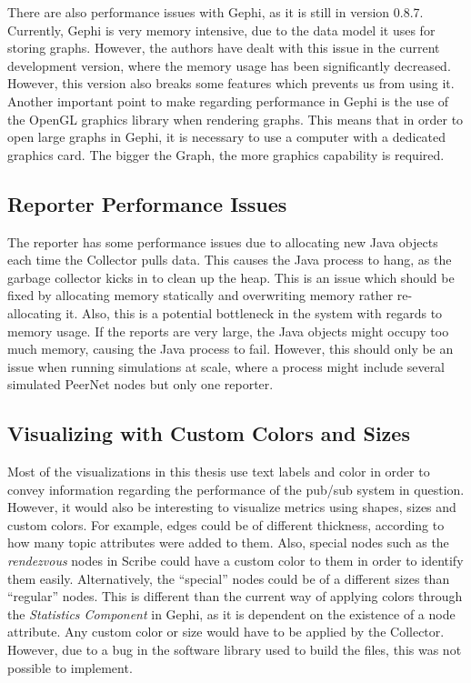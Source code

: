 There are also performance issues with Gephi, as it is still in version
0.8.7. Currently, Gephi is very memory intensive, due to the data model
it uses for storing graphs. However, the authors have dealt with this
issue in the current development version, where the memory usage has
been significantly decreased. However, this version also breaks some
features which prevents us from using it. Another important point to
make regarding performance in Gephi is the use of the OpenGL graphics
library when rendering graphs. This means that in order to open large
graphs in Gephi, it is necessary to use a computer with a dedicated
graphics card. The bigger the Graph, the more graphics capability is
required.

\subsection{Reporter Performance Issues}

The reporter has some performance issues due to allocating new Java
objects each time the Collector pulls data. This causes the Java process to
hang, as the garbage collector kicks in to clean up the heap. This is an
issue which should be fixed by allocating memory statically and
overwriting memory rather re-allocating it. Also, this is a potential bottleneck
in the system with regards to memory usage. If the reports are very large, the Java
objects might occupy too much  memory, causing the Java process to
fail. However, this should only be an issue when  running simulations at
scale, where a process might include several simulated PeerNet nodes but only one
reporter.

\subsection{Visualizing with Custom Colors and Sizes}

Most of the visualizations in this thesis use text labels and color in
order to convey information regarding the performance of the pub/sub
system in question. However, it would also be interesting to visualize
metrics using shapes, sizes and custom colors. For example, edges could
be of different thickness, according to how many topic attributes were
added to them. Also, special nodes such as the \emph{rendezvous} nodes
in Scribe could have a custom color to them in order to identify them
easily. Alternatively, the ``special'' nodes could be of a different sizes than
``regular'' nodes. This is different than the current way of applying
colors through the \emph{Statistics Component} in Gephi, as it is
dependent on the existence of a node attribute. Any custom color or size
would have to be applied by the Collector. However, due to a bug in the
software library used to build the \gexf{} files, this was not possible
to implement.


